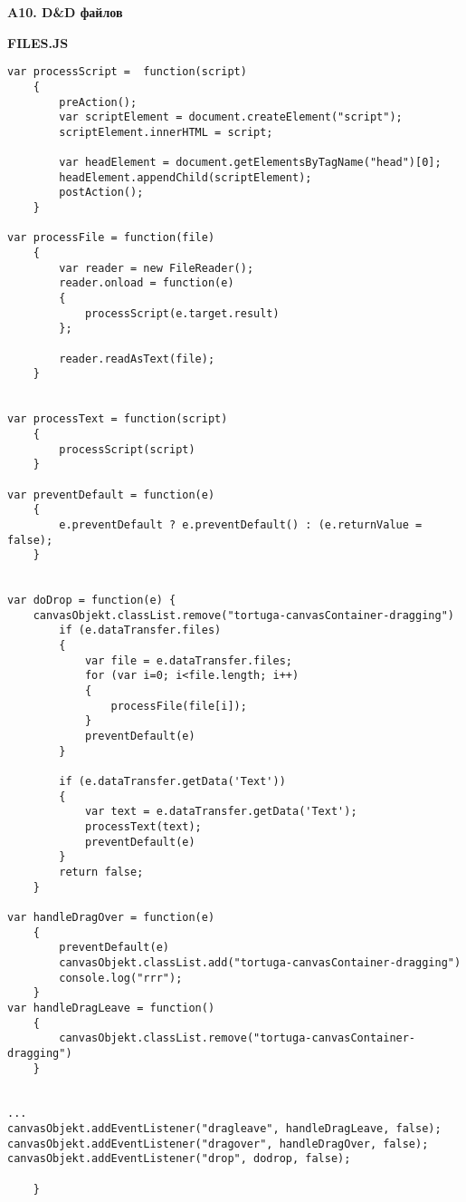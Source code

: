 \vspace{16mm}
\textbf{\Large A10. D\&D файлов}
\vspace{6mm}

\textbf{FILES.JS}
\begin{verbatim}
var processScript =  function(script)
    {
        preAction();
        var scriptElement = document.createElement("script");
        scriptElement.innerHTML = script;

        var headElement = document.getElementsByTagName("head")[0];
        headElement.appendChild(scriptElement);
        postAction();
    }

var processFile = function(file)
    {
        var reader = new FileReader();
        reader.onload = function(e)
        {
            processScript(e.target.result)
        };

        reader.readAsText(file);
    }


var processText = function(script)
    {
        processScript(script)
    }

var preventDefault = function(e)
    {
        e.preventDefault ? e.preventDefault() : (e.returnValue = false);
    }


var doDrop = function(e) {
    canvasObjekt.classList.remove("tortuga-canvasContainer-dragging")
        if (e.dataTransfer.files)
        {
            var file = e.dataTransfer.files;
            for (var i=0; i<file.length; i++)
            {
                processFile(file[i]);
            }
            preventDefault(e)
        }

        if (e.dataTransfer.getData('Text'))
        {
            var text = e.dataTransfer.getData('Text');
            processText(text);
            preventDefault(e)
        }
        return false;
    }

var handleDragOver = function(e)
    {
        preventDefault(e)
        canvasObjekt.classList.add("tortuga-canvasContainer-dragging")
        console.log("rrr");
    }
var handleDragLeave = function()
    {
        canvasObjekt.classList.remove("tortuga-canvasContainer-dragging")
    }


...
canvasObjekt.addEventListener("dragleave", handleDragLeave, false);
canvasObjekt.addEventListener("dragover", handleDragOver, false);
canvasObjekt.addEventListener("drop", dodrop, false);

    }
\end{verbatim}